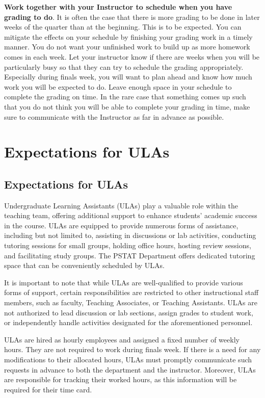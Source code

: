 \documentclass[
  letterpaper,
  DIV=11,
  numbers=noendperiod]{scrreprt}
\begin{document}
\textbf{Work together with your Instructor to schedule when you have
grading to do}. It is often the case that there is more grading to be
done in later weeks of the quarter than at the beginning. This is to be
expected. You can mitigate the effects on your schedule by finishing
your grading work in a timely manner. You do not want your unfinished
work to build up as more homework comes in each week. Let your
instructor know if there are weeks when you will be particularly busy so
that they can try to schedule the grading appropriately. Especially
during finals week, you will want to plan ahead and know how much work
you will be expected to do. Leave enough space in your schedule to
complete the grading on time. In the rare case that something comes up
such that you do not think you will be able to complete your grading in
time, make sure to communicate with the Instructor as far in advance as
possible.

\part{\textbf{Expectations for ULAs}}

\hypertarget{expectations-for-ulas-1}{%
\chapter{Expectations for ULAs}\label{expectations-for-ulas-1}}

Undergraduate Learning Assistants (ULAs) play a valuable role within the
teaching team, offering additional support to enhance students' academic
success in the course. ULAs are equipped to provide numerous forms of
assistance, including but not limited to, assisting in discussions or
lab activities, conducting tutoring sessions for small groups, holding
office hours, hosting review sessions, and facilitating study groups.
The PSTAT Department offers dedicated tutoring space that can be
conveniently scheduled by ULAs.

It is important to note that while ULAs are well-qualified to provide
various forms of support, certain responsibilities are restricted to
other instructional staff members, such as faculty, Teaching Associates,
or Teaching Assistants. ULAs are not authorized to lead discussion or
lab sections, assign grades to student work, or independently handle
activities designated for the aforementioned personnel.

ULAs are hired as hourly employees and assigned a fixed number of weekly
hours. They are not required to work during finals week. If there is a
need for any modifications to their allocated hours, ULAs must promptly
communicate such requests in advance to both the department and the
instructor. Moreover, ULAs are responsible for tracking their worked
hours, as this information will be required for their time card.
\end{document}
